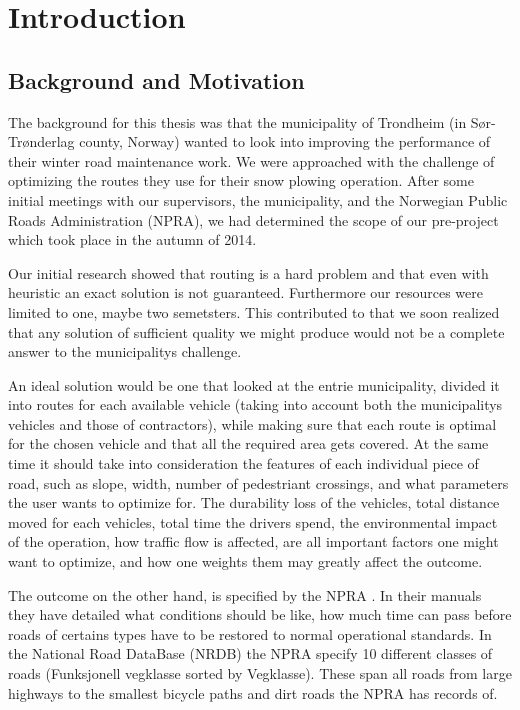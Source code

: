 \chapter{Introduction}

\section{Background and Motivation}

The background for this thesis was that the municipality of Trondheim (in Sør-Trønderlag county, Norway) wanted to look into improving the performance of their winter road maintenance work. We were approached with the challenge of optimizing the routes they use for their snow plowing operation. After some initial meetings with our supervisors, the municipality, and the Norwegian Public Roads Administration (NPRA), we had determined the scope of our pre-project which took place in the autumn of 2014.

Our initial research showed that routing is a hard problem and that even with heuristic an exact solution is not guaranteed. Furthermore our resources were limited to one, maybe two semetsters. This contributed to that we soon realized that any solution of sufficient quality we might produce would not be a complete answer to the municipalitys challenge.

An ideal solution would be one that looked at the entrie municipality, divided it into routes for each available vehicle (taking into account both the municipalitys vehicles and those of contractors), while making sure that each route is optimal for the chosen vehicle and that all the required area gets covered. At the same time it should take into consideration the features of each individual piece of road, such as slope, width, number of pedestriant crossings, and what parameters the user wants to optimize for. The durability loss of the vehicles, total distance moved for each vehicles, total time the drivers spend, the environmental impact of the operation, how traffic flow is affected, are all important factors one might want to optimize, and how one weights them may greatly affect the outcome.

The outcome on the other hand, is specified by the NPRA
. In their manuals they have detailed what conditions should be like, how much time can pass before roads of certains types have to be restored to normal operational standards. In the National Road DataBase (NRDB) 
the NPRA specify 10 different classes of roads (Funksjonell vegklasse sorted by Vegklasse). These span all roads from large highways to the smallest bicycle paths and dirt roads the NPRA has records of.

